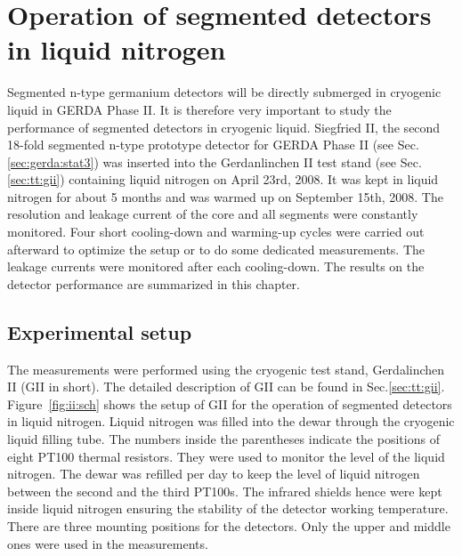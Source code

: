 \chapter[Operation of segmented detectors in LN$_{2}$]{Operation of segmented detectors in liquid nitrogen}
\label{cha:GII}
Segmented n-type germanium detectors will be directly submerged in cryogenic liquid in GERDA Phase II. It is therefore very important to study the performance of segmented detectors in cryogenic liquid. Siegfried II, the second 18-fold segmented n-type prototype detector for GERDA Phase II (see Sec.\ref{sec:gerda:stat3}) was inserted into the Gerdanlinchen II test stand (see Sec.\ref{sec:tt:gii}) containing liquid nitrogen on April 23rd, 2008. It was kept in liquid nitrogen for about 5 months and was warmed up on September 15th, 2008. The resolution and leakage current of the core and all segments were constantly monitored. Four short cooling-down and warming-up cycles were carried out afterward to optimize the setup or to do some dedicated measurements. The leakage currents were monitored after each cooling-down. The results on the detector performance are summarized in this chapter.

\section{Experimental setup}
\label{sec:gii:setup}
The measurements were performed using the cryogenic test stand, Gerdalinchen II (GII in short). The detailed description of GII can be found in Sec.\ref{sec:tt:gii}.  Figure~\ref{fig:ii:sch} shows the setup of GII for the operation of segmented detectors in liquid nitrogen. Liquid nitrogen was filled into the dewar through the cryogenic liquid filling tube. The numbers inside the parentheses indicate the positions of eight PT100 thermal resistors. They were used to monitor the level of the liquid nitrogen. The dewar was refilled per day to keep the level of liquid nitrogen between the second and the third PT100s. The infrared shields hence were kept inside liquid nitrogen ensuring the stability of the detector working temperature. There are three mounting positions for the detectors. Only the upper and middle ones were used in the measurements.

